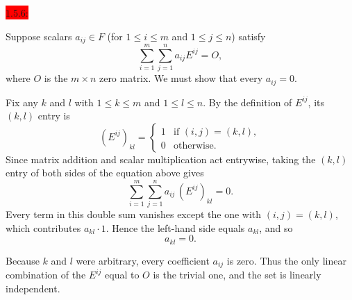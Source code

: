 \documentclass{exam}
\begin{document}
  \colorbox{red}{\underline{$1.5.6$}:}
  \begin{solution}
    Suppose scalars $a_{ij} \in F$ (for $1 \le i \le m$ and $1 \le j \le n$) satisfy
    \[
      \sum_{i=1}^{m} \sum_{j=1}^{n} a_{ij} E^{ij} = O,
    \]
    where $O$ is the $m \times n$ zero matrix. We must show that every $a_{ij} = 0$.
 
    Fix any $k$ and $l$ with $1 \le k \le m$ and $1 \le l \le n$. By the definition of $E^{ij}$, its $(k,l)$ entry is
    \[
      (E^{ij})_{kl} =
      \begin{cases}
        1 & \text{if } (i,j) = (k,l), \\
        0 & \text{otherwise.}
      \end{cases}
    \]
    Since matrix addition and scalar multiplication act entrywise, taking the $(k,l)$ entry of both sides of the equation above gives
    \[
      \sum_{i=1}^{m} \sum_{j=1}^{n} a_{ij} \,(E^{ij})_{kl} = 0.
    \]
    Every term in this double sum vanishes except the one with $(i,j) = (k,l)$, which contributes $a_{kl} \cdot 1$. Hence the left-hand side equals $a_{kl}$, and so
    \[
      a_{kl} = 0.
    \]
    
    Because $k$ and $l$ were arbitrary, every coefficient $a_{ij}$ is zero. Thus the only linear combination of the $E^{ij}$ equal to $O$ is the trivial one, and the set is linearly independent.
  \end{solution}
\end{document}
